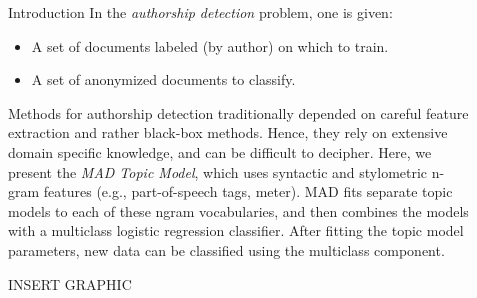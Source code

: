 \documentclass[final]{beamer}
\newlength{\sepwid}
\newlength{\onecolwid}
\newlength{\twocolwid}
\begin{document}
\begin{frame}[t]
\begin{columns}[t]
\begin{column}{\onecolwid}
\begin{block}{Introduction}
In the \textit{authorship detection} problem, one is given:
\begin{itemize}
\item A set of documents labeled (by author) on which to train.
\item A set of anonymized documents to classify.
\end{itemize} Methods for authorship detection traditionally depended on careful feature extraction and rather black-box methods. Hence, they rely on extensive domain specific knowledge, and can be difficult to decipher. Here, we present the \textit{MAD Topic Model}, which uses  syntactic and stylometric n-gram features (e.g., part-of-speech tags, meter). MAD fits separate topic models to each of these ngram vocabularies, and then combines the models with a multiclass logistic regression classifier. After fitting the topic model parameters, new data can be classified using the multiclass component. 

INSERT GRAPHIC

\end{block}




\end{column} %

\begin{column}{\sepwid}\end{column} %

\begin{column}{\twocolwid} %

\begin{columns}[t,totalwidth=\twocolwid] %

\begin{column}{\onecolwid}\vspace{-.6in} %




\end{column}
\end{columns}
\end{column}
\end{columns}
\end{frame}
\end{document}
